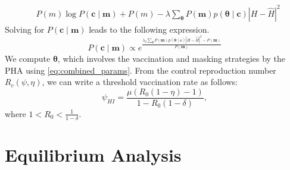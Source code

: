 \documentclass[sigconf,review]{acmart}
\newcommand{\abs}[1]{\left| #1 \right|}
\begin{document}
\begin{equation}
    \begin{aligned}
   & P(m) \log P(\boldsymbol{c}\mid \boldsymbol{m}) + P(m)    -\lambda \sum\limits_{\boldsymbol{\theta}}P(\boldsymbol{m})p(\boldsymbol{\theta}\mid \boldsymbol{c})\abs{H - \widehat{H}}^2
\end{aligned}
\end{equation}
\noindent
Solving for $P(\boldsymbol{c}\mid\boldsymbol{m})$ leads to the following expression.
\begin{equation}
    P(\boldsymbol{c}\mid\boldsymbol{m}) \propto e^{\frac{\lambda_2 \sum\limits_{\boldsymbol{\theta}}P(\boldsymbol{m})p(\boldsymbol{\theta}\mid \boldsymbol{c})\abs{H - \widehat{H}}^2-P(\boldsymbol{m})}{P(\boldsymbol{m})}}
\end{equation}
We compute $\boldsymbol{\theta}$, which involves the vaccination and masking strategies by the PHA using \eqref{eq:combined_params}.
From the control reproduction number $R_c(\psi,\eta)$, we can write a threshold vaccination rate as follows:
\begin{equation}
\psi_{HI} = \frac{\mu\left(R_0(1-\eta)-1\right)}{1-R_0(1-\delta)},
\end{equation}
where $1<R_0<\frac{1}{1-\delta}$. 

\section{Equilibrium Analysis}


\end{document}
